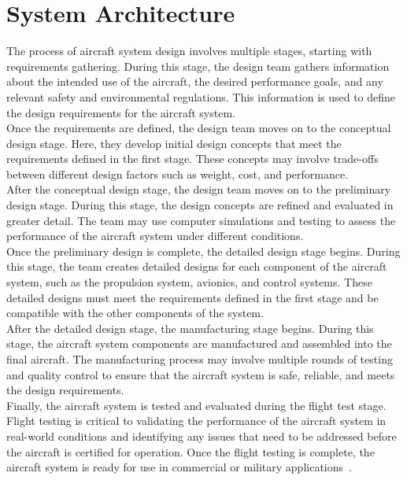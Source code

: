 \section{System Architecture}\label{sec:system-architecture}
The process of aircraft system design involves multiple stages, starting with requirements gathering.
During this stage, the design team gathers information about the intended use of the aircraft, the desired performance goals, and any relevant safety and environmental regulations.
This information is used to define the design requirements for the aircraft system.
\\
Once the requirements are defined, the design team moves on to the conceptual design stage.
Here, they develop initial design concepts that meet the requirements defined in the first stage.
These concepts may involve trade-offs between different design factors such as weight, cost, and performance.
\\
After the conceptual design stage, the design team moves on to the preliminary design stage.
During this stage, the design concepts are refined and evaluated in greater detail.
The team may use computer simulations and testing to assess the performance of the aircraft system under different conditions.
\\
Once the preliminary design is complete, the detailed design stage begins.
During this stage, the team creates detailed designs for each component of the aircraft system, such as the propulsion system, avionics, and control systems.
These detailed designs must meet the requirements defined in the first stage and be compatible with the other components of the system.
\\
After the detailed design stage, the manufacturing stage begins.
During this stage, the aircraft system components are manufactured and assembled into the final aircraft.
The manufacturing process may involve multiple rounds of testing and quality control to ensure that the aircraft system is safe, reliable, and meets the design requirements.
\\
Finally, the aircraft system is tested and evaluated during the flight test stage.
Flight testing is critical to validating the performance of the aircraft system in real-world conditions and identifying any issues that need to be addressed before the aircraft is certified for operation.
Once the flight testing is complete, the aircraft system is ready for use in commercial or military applications~\cite{lfs1}.

